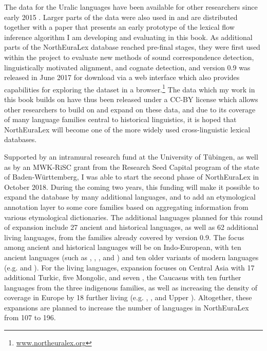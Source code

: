The data for the Uralic languages have been available for other researchers since early 2015 \citep{dellert2015a}. Larger parts of the data were also used in and are distributed together with a paper \citep{dellert2016a} that presents an early prototype of the lexical flow inference algorithm I am developing and evaluating in this book. As additional parts of the NorthEuraLex database reached pre-final stages, they were first used within the project to evaluate new methods of sound correspondence detection, linguistically motivated alignment, and cognate detection, and version 0.9 was released in June 2017 for download via a web interface which also provides capabilities for exploring the dataset in a browser.\footnote{\url{www.northeuralex.org}} The data which my work in this book builds on have thus been released under a CC-BY license which allows other researchers to build on and expand on these data, and due to its coverage of many language families central to historical linguistics, it is hoped that NorthEuraLex will become one of the more widely used cross-linguistic lexical databases.

Supported by an intramural research fund at the University of T\"ubingen, as well as by an MWK-RiSC grant from the Research Seed Capital program of the state of Baden-W\"urttemberg, I was able to start the second phase of NorthEuraLex in October 2018. During the coming two years, this funding will make it possible to expand the database by many additional languages, and to add an etymological annotation layer to some core families based on aggregating information from various etymological dictionaries. The additional languages planned for this round of expansion include 27 ancient and historical languages, as well as 62 additional living languages, from the families already covered by version 0.9. The focus among ancient and historical languages will be on Indo-European, with ten ancient languages (such as , , , and ) and ten older variants of modern languages (e.g.  and ). For the living languages, expansion focuses on Central Asia with 17 additional Turkic, five Mongolic, and seven , the Caucasus with ten further languages from the three indigenous families, as well as increasing the density of coverage in Europe by 18 further living  (e.g. , , and Upper ). Altogether, these expansions are planned to increase the number of languages in NorthEuraLex from 107 to 196.

